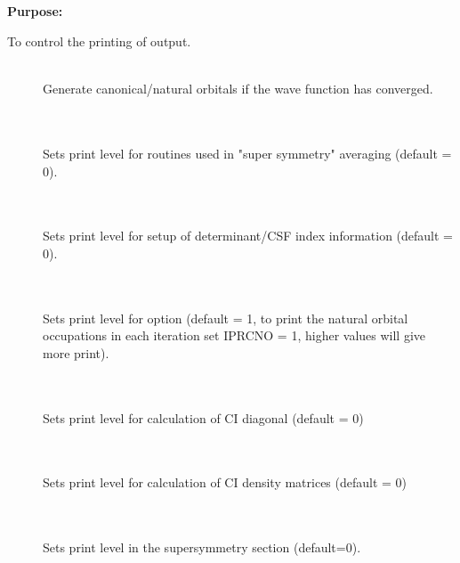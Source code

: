 \pagebreak[3]
\subsection{\label{ref-priinp}}

{\bf Purpose:}

To control the printing of output.

\begin{description}
\item[] \ \\
  Generate canonical/natural orbitals if the wave function has
  converged.

\item[] \ \\
   \\
  Sets print level for routines used in "super symmetry" averaging
  (default = 0).

\item[] \ \\
   \\
  Sets print level for setup of determinant/CSF index information (default = 0).

\item[] \ \\
   \\
  Sets print level for  option (default = 1,
  to print the natural orbital occupations in each iteration set
  IPRCNO = 1, higher values will give more print).

\item[] \ \\
   \\
  Sets print level for calculation of CI diagonal (default = 0)

\item[] \ \\
   \\
  Sets print level for calculation of CI density matrices (default = 0)


\item[] \ \\
   \\
  Sets print level in the supersymmetry section (default=0).


\end{description}
